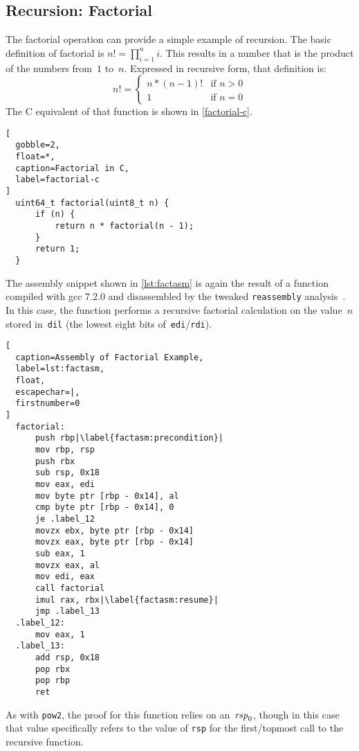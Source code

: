 \subsection{Recursion: Factorial}
The factorial operation can provide a simple example of recursion.
The basic definition of factorial is $n!=\prod_{i=1}^n i$.%
This results in a number that is the product of the numbers from~$1$ to~$n$.
Expressed in recursive form, that definition is:
\begin{equation}
  n!=\begin{cases}
    n * (n - 1)! & \text{if }n > 0 \\
    1 & \text{if }n = 0
  \end{cases}
\end{equation}
The C equivalent of that function is shown in \cref{factorial-c}.
\begin{lstlisting}[
  gobble=2,
  float=*,
  caption=Factorial in C,
  label=factorial-c
]
  uint64_t factorial(uint8_t n) {
      if (n) {
          return n * factorial(n - 1);
      }
      return 1;
  }
\end{lstlisting}
The assembly snippet shown in \cref{lst:factasm} is again
the result of a function compiled with \ac{gcc} 7.2.0
and disassembled by the tweaked \lstinline|reassembly| analysis~\citep{wang2017ramblr}.
In this case, the function performs a recursive factorial calculation on the value~$n$ stored in~\lstinline|dil| (the lowest eight bits of~\lstinline|edi|/\lstinline|rdi|).
\begin{lstlisting}[
  caption=Assembly of Factorial Example,
  label=lst:factasm,
  float,
  escapechar=|,
  firstnumber=0
]
  factorial:
      push rbp|\label{factasm:precondition}|
      mov rbp, rsp
      push rbx
      sub rsp, 0x18
      mov eax, edi
      mov byte ptr [rbp - 0x14], al
      cmp byte ptr [rbp - 0x14], 0
      je .label_12
      movzx ebx, byte ptr [rbp - 0x14]
      movzx eax, byte ptr [rbp - 0x14]
      sub eax, 1
      movzx eax, al
      mov edi, eax
      call factorial
      imul rax, rbx|\label{factasm:resume}|
      jmp .label_13
  .label_12:
      mov eax, 1
  .label_13:
      add rsp, 0x18
      pop rbx
      pop rbp
      ret
\end{lstlisting}
As with \lstinline|pow2|, the proof for this function relies on an~$\mathit{rsp}_0$,
though in this case that value specifically refers to the value of \lstinline|rsp|
for the first/topmost call to the recursive function.
